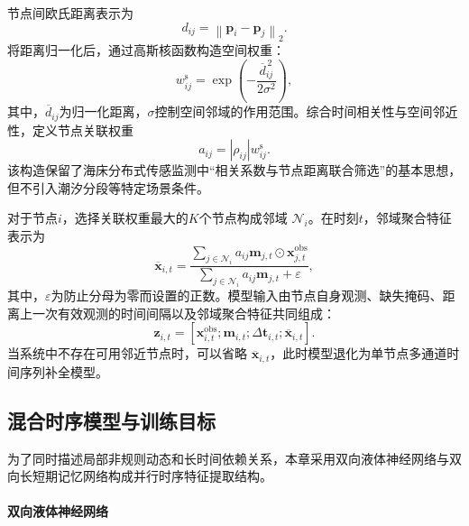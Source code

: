 节点间欧氏距离表示为
\begin{equation}
    d_{ij}
    =
    \left\|
    \boldsymbol{p}_i-\boldsymbol{p}_j
    \right\|_2.
\end{equation}
将距离归一化后，通过高斯核函数构造空间权重：
\begin{equation}
    w_{ij}^{\mathrm{s}}
    =
    \exp\left(
    -\frac{\overline{d}_{ij}^{\,2}}{2\sigma^2}
    \right),
\end{equation}
其中，$\overline{d}_{ij}$为归一化距离，$\sigma$控制空间邻域的作用范围。综合时间相关性与空间邻近性，定义节点关联权重
\begin{equation}
    a_{ij}
    =
    |\rho_{ij}|w_{ij}^{\mathrm{s}}.
\end{equation}
该构造保留了海床分布式传感监测中“相关系数与节点距离联合筛选”的基本思想\cite{ge2024spatiotemporal}，但不引入潮汐分段等特定场景条件。

对于节点$i$，选择关联权重最大的$K$个节点构成邻域
$\mathcal{N}_i$。在时刻$t$，邻域聚合特征表示为
\begin{equation}
    \overline{\boldsymbol{x}}_{i,t}
    =
    \frac{
    \sum_{j\in\mathcal{N}_i}
    a_{ij}\boldsymbol{m}_{j,t}
    \odot\boldsymbol{x}_{j,t}^{\mathrm{obs}}
    }{
    \sum_{j\in\mathcal{N}_i}
    a_{ij}\boldsymbol{m}_{j,t}
    +\varepsilon
    },
\end{equation}
其中，$\varepsilon$为防止分母为零而设置的正数。模型输入由节点自身观测、缺失掩码、距离上一次有效观测的时间间隔以及邻域聚合特征共同组成：
\begin{equation}
    \boldsymbol{z}_{i,t}
    =
    \left[
    \boldsymbol{x}_{i,t}^{\mathrm{obs}};
    \boldsymbol{m}_{i,t};
    \Delta\boldsymbol{t}_{i,t};
    \overline{\boldsymbol{x}}_{i,t}
    \right].
\end{equation}
当系统中不存在可用邻近节点时，可以省略
$\overline{\boldsymbol{x}}_{i,t}$，此时模型退化为单节点多通道时间序列补全模型。

\subsection{混合时序模型与训练目标}

为了同时描述局部非规则动态和长时间依赖关系，本章采用双向液体神经网络与双向长短期记忆网络构成并行时序特征提取结构。

\paragraph{双向液体神经网络}

